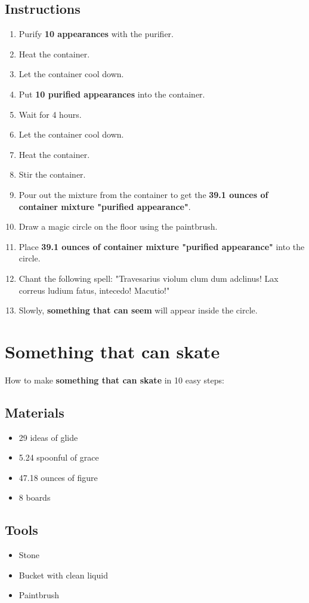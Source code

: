 \documentclass{article}
\begin{document}
\subsection{Instructions}\begin{enumerate}
\item 
Purify \textbf{10 appearances} with the purifier.
\item 
Heat the container.
\item 
Let the container cool down.
\item 
Put \textbf{10 purified appearances} into the container.
\item 
Wait for 4 hours.
\item 
Let the container cool down.
\item 
Heat the container.
\item 
Stir the container.
\item 
Pour out the mixture from the container to get the \textbf{39.1 ounces of container mixture "purified appearance"}.
\item 
Draw a magic circle on the floor using the paintbrush.
\item 
Place \textbf{39.1 ounces of container mixture "purified appearance"} into the circle.
\item 
Chant the following spell: "Travesarius violum clum dum adclinus! Lax correus ludium fatus, intecedo! Macutio!"
\item 
Slowly, \textbf{something that can seem} will appear inside the circle.
\end{enumerate}
\newpage
\section{Something that can skate}How to make \textbf{something that can skate} in 10 easy steps:

\subsection{Materials}\begin{itemize}
\item 
29 ideas of glide
\item 
5.24 spoonful of grace
\item 
47.18 ounces of figure
\item 
8 boards
\end{itemize}
\subsection{Tools}\begin{itemize}
\item 
Stone
\item 
Bucket with clean liquid
\item 
Paintbrush
\end{itemize}
\end{document}
